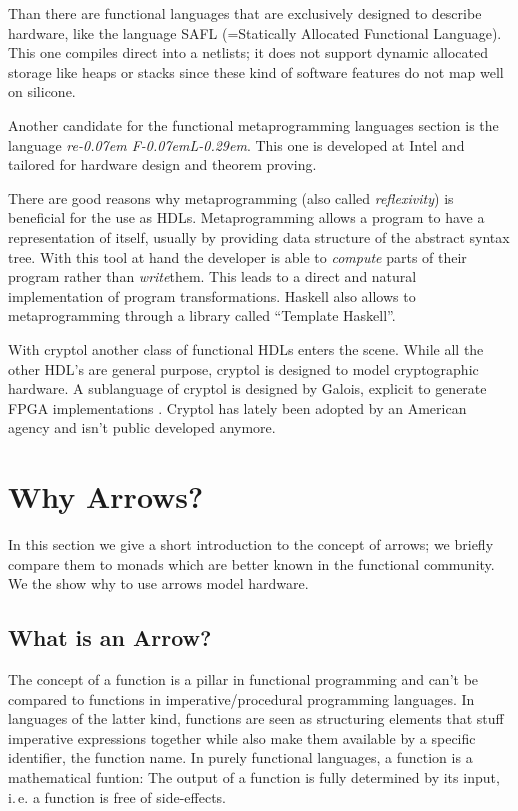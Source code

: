 \documentclass[11pt,final,a4paper]{article}
\newcommand{\reFLect}{\textit{re\kern-0.07em F\kern-0.07emL\kern-0.29em\raisebox{0.56ex}{ect}}}
\begin{document}
Than there are functional languages that are exclusively designed to describe hardware, like the language SAFL (=Statically Allocated
Functional Language)\cite{sharp,sharp:flash,sharp:codesign}. This one compiles direct into a netlists; it does not support dynamic allocated
storage like heaps or stacks since these kind of software features do not map well on silicone. 

Another candidate for the functional metaprogramming languages section is the language \reFLect \cite{reflect}. This one is developed at
Intel and tailored for hardware design and theorem proving. 

There are good reasons why metaprogramming (also called \emph{reflexivity}) is beneficial for the use as HDLs. Metaprogramming allows a
program to have a representation of itself, usually by providing data structure of the abstract syntax tree. With this tool at hand the
developer is able to \emph{compute} parts of their program rather than \emph{write}them. This leads to a direct and natural implementation
of program transformations. Haskell also allows to metaprogramming through a library called ``Template Haskell''\cite{haskell:template}. 

With cryptol\cite{cryptol:programming} another class of functional HDLs enters the scene. While all the other HDL's are general purpose,
cryptol is designed to model cryptographic hardware. A sublanguage of cryptol is designed by Galois, explicit to generate FPGA
implementations \cite{cryptol:fpga}. Cryptol has lately been adopted by an American agency and isn't public developed anymore.

\section{Why Arrows?}
In this section we give a short introduction to the concept of arrows; we briefly compare them to monads which are better known in the
functional community. We the show why to use arrows model hardware. 

\subsection{What is an Arrow?}

The concept of a function is a pillar in functional programming and can't be compared to functions in imperative/procedural programming
languages. In languages of the latter kind, functions are seen as structuring elements that stuff imperative expressions together while also
make them available by a specific identifier, the function name. In purely functional languages, a function is a mathematical
funtion: The output of a function is fully determined by its input, i.\,e. a function is free of side-effects. 
\end{document}
